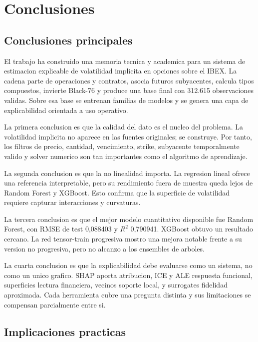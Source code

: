 \chapter{Conclusiones}
\label{chap:conclusiones}

\section{Conclusiones principales}

El trabajo ha construido una memoria tecnica y academica para un sistema de estimacion explicable de volatilidad implicita en opciones sobre el IBEX. La cadena parte de operaciones y contratos, asocia futuros subyacentes, calcula tipos compuestos, invierte Black-76 y produce una base final con 312.615 observaciones validas. Sobre esa base se entrenan familias de modelos y se genera una capa de explicabilidad orientada a uso operativo.

La primera conclusion es que la calidad del dato es el nucleo del problema. La volatilidad implicita no aparece en las fuentes originales; se construye. Por tanto, los filtros de precio, cantidad, vencimiento, strike, subyacente temporalmente valido y solver numerico son tan importantes como el algoritmo de aprendizaje.

La segunda conclusion es que la no linealidad importa. La regresion lineal ofrece una referencia interpretable, pero su rendimiento fuera de muestra queda lejos de Random Forest y XGBoost. Esto confirma que la superficie de volatilidad requiere capturar interacciones y curvaturas.

La tercera conclusion es que el mejor modelo cuantitativo disponible fue Random Forest, con RMSE de test 0,088403 y $R^2$ 0,790941. XGBoost obtuvo un resultado cercano. La red tensor-train progresiva mostro una mejora notable frente a su version no progresiva, pero no alcanzo a los ensembles de arboles.

La cuarta conclusion es que la explicabilidad debe evaluarse como un sistema, no como un unico grafico. SHAP aporta atribucion, ICE y ALE respuesta funcional, superficies lectura financiera, vecinos soporte local, y surrogates fidelidad aproximada. Cada herramienta cubre una pregunta distinta y sus limitaciones se compensan parcialmente entre si.

\section{Implicaciones practicas}

